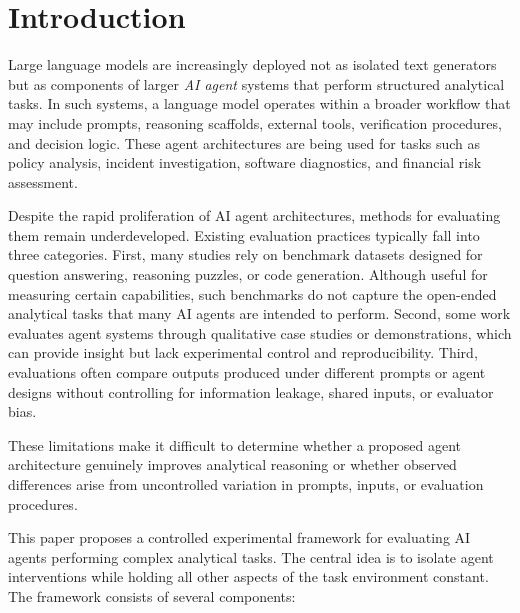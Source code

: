 


\section{Introduction}

Large language models are increasingly deployed not as isolated text generators
but as components of larger \emph{AI agent} systems that perform structured
analytical tasks. In such systems, a language model operates within a broader
workflow that may include prompts, reasoning scaffolds, external tools,
verification procedures, and decision logic. These agent architectures are
being used for tasks such as policy analysis, incident investigation, software
diagnostics, and financial risk assessment.

Despite the rapid proliferation of AI agent architectures, methods for
evaluating them remain underdeveloped. Existing evaluation practices typically
fall into three categories. First, many studies rely on benchmark datasets
designed for question answering, reasoning puzzles, or code generation.
Although useful for measuring certain capabilities, such benchmarks do not
capture the open-ended analytical tasks that many AI agents are intended to
perform. Second, some work evaluates agent systems through qualitative case
studies or demonstrations, which can provide insight but lack experimental
control and reproducibility. Third, evaluations often compare outputs produced
under different prompts or agent designs without controlling for information
leakage, shared inputs, or evaluator bias.

These limitations make it difficult to determine whether a proposed agent
architecture genuinely improves analytical reasoning or whether observed
differences arise from uncontrolled variation in prompts, inputs, or evaluation
procedures.

This paper proposes a controlled experimental framework for evaluating AI
agents performing complex analytical tasks. The central idea is to isolate
agent interventions while holding all other aspects of the task environment
constant. The framework consists of several components:

